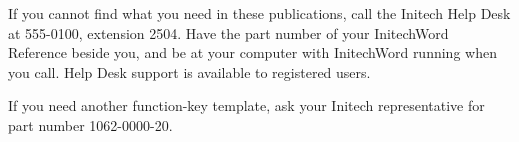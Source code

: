If you cannot find what you need in these publications, call the Initech
Help Desk at 555-0100, extension 2504.  Have the part number of your
InitechWord Reference beside you, and be at your computer with InitechWord
running when you call.  Help Desk support is available to registered users.

If you need another function-key template, ask your Initech representative
for part number 1062-0000-20.
